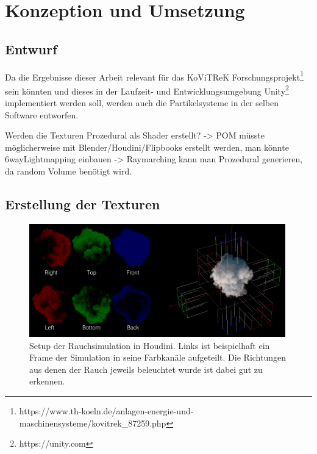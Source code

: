 \section{Konzeption und Umsetzung}
\label{sec:4}
\subsection{Entwurf}

Da die Ergebnisse dieser Arbeit relevant für das KoViTReK Forschungsprojekt\footnote{https://www.th-koeln.de/anlagen-energie-und-maschinensysteme/kovitrek\_87259.php}
sein könnten und dieses in der Laufzeit- und Entwicklungsumgebung Unity\footnote{https://unity.com}
implementiert werden soll, werden auch die Partikelsysteme in der selben Software entworfen.

Werden die Texturen Prozedural als Shader erstellt? \newline
-> POM müsste möglicherweise mit Blender/Houdini/Flipbooks erstellt werden, man könnte 6wayLightmapping einbauen\newline
-> Raymarching kann man Prozedural generieren, da random Volume benötigt wird.\newline



\subsection{Erstellung der Texturen}
\label{sec:4.1}


\begin{figure}[h!b]
    \includegraphics[width=0.99\textwidth]{Grafiken/Implementation/SmokeSimulation_Houdini.jpg}
    \begin{footnotesize}
        \caption{Setup der Rauchsimulation in Houdini. Links ist beispielhaft ein Frame der Simulation in seine Farbkanäle aufgeteilt. 
        Die Richtungen aus denen der Rauch jeweils beleuchtet wurde ist dabei gut zu erkennen. }
    \end{footnotesize}
\end{figure}





